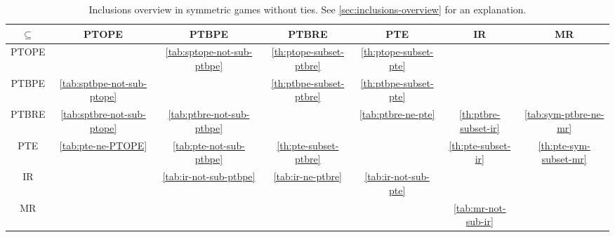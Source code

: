 \begin{sidewaystable}
	\caption{Inclusions overview in symmetric games without ties. See \autoref{sec:inclusions-overview} for an explanation.}
	\label{tab:overview-sym-nodup}
	\begin{tabular}{|c|c|c|c|c|c|c|}
		\hline
		$\subseteq$  & PTOPE & PTBPE & PTBRE & PTE & IR & MR \\
		\hline
		PTOPE & \cellcolor{gray!30} & \cellcolor{red!30} \autoref{tab:sptope-not-sub-ptbpe} & \cellcolor{green!30} \autoref{th:ptope-subset-ptbre} & \cellcolor{green!30} \autoref{th:ptope-subset-pte} & \cellcolor{green!15} & \cellcolor{green!15} \\
		\hline
		PTBPE & \cellcolor{red!30} \autoref{tab:sptbpe-not-sub-ptope} & \cellcolor{gray!30} & \cellcolor{green!30} \autoref{th:ptbpe-subset-ptbre} & \cellcolor{green!30} \autoref{th:ptbpe-subset-pte} & \cellcolor{green!15} & \cellcolor{green!15} \\
		\hline
		PTBRE & \cellcolor{red!30} \autoref{tab:sptbre-not-sub-ptope} & \cellcolor{red!30} \autoref{tab:ptbre-not-sub-ptbpe} & \cellcolor{gray!30} & \cellcolor{red!30} \autoref{tab:ptbre-ne-pte} & \cellcolor{green!30} \autoref{th:ptbre-subset-ir} & \cellcolor{red!30} \autoref{tab:sym-ptbre-ne-mr} \\
		\hline
		PTE & \cellcolor{red!30} \autoref{tab:pte-ne-PTOPE} & \cellcolor{red!30} \autoref{tab:pte-not-sub-ptbpe} & \cellcolor{green!30} \autoref{th:pte-subset-ptbre} & \cellcolor{gray!30} & \cellcolor{green!30} \autoref{th:pte-subset-ir} & \cellcolor{green!30} \autoref{th:pte-sym-subset-mr} \\
		\hline
		IR & \cellcolor{red!15} & \cellcolor{red!30} \autoref{tab:ir-not-sub-ptbpe} & \cellcolor{red!30} \autoref{tab:ir-ne-ptbre} & \cellcolor{red!30} \autoref{tab:ir-not-sub-pte} & \cellcolor{gray!30} & \cellcolor{red!15} \\
		\hline
		MR & \cellcolor{red!15} & \cellcolor{red!15} & \cellcolor{red!15} & \cellcolor{red!15} & \cellcolor{red!30} \autoref{tab:mr-not-sub-ir} & \cellcolor{gray!30} \\
		\hline
		\end{tabular}
\end{sidewaystable}
